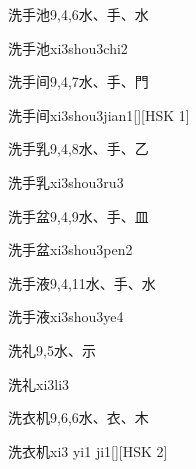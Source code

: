 \begin{Entry}{洗手池}{9,4,6}{⽔、⼿、⽔}
  \begin{Phonetics}{洗手池}{xi3shou3chi2}
  \end{Phonetics}
\end{Entry}

\begin{Entry}{洗手间}{9,4,7}{⽔、⼿、⾨}
  \begin{Phonetics}{洗手间}{xi3shou3jian1}[][HSK 1]
  \end{Phonetics}
\end{Entry}

\begin{Entry}{洗手乳}{9,4,8}{⽔、⼿、⼄}
  \begin{Phonetics}{洗手乳}{xi3shou3ru3}
  \end{Phonetics}
\end{Entry}

\begin{Entry}{洗手盆}{9,4,9}{⽔、⼿、⽫}
  \begin{Phonetics}{洗手盆}{xi3shou3pen2}
  \end{Phonetics}
\end{Entry}

\begin{Entry}{洗手液}{9,4,11}{⽔、⼿、⽔}
  \begin{Phonetics}{洗手液}{xi3shou3ye4}
  \end{Phonetics}
\end{Entry}

\begin{Entry}{洗礼}{9,5}{⽔、⽰}
  \begin{Phonetics}{洗礼}{xi3li3}
  \end{Phonetics}
\end{Entry}

\begin{Entry}{洗衣机}{9,6,6}{⽔、⾐、⽊}
  \begin{Phonetics}{洗衣机}{xi3 yi1 ji1}[][HSK 2]
  \end{Phonetics}
\end{Entry}

